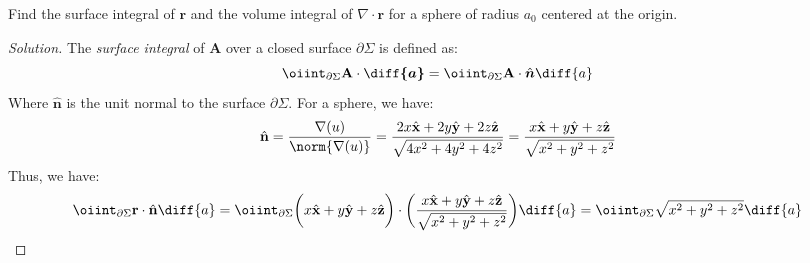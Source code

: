 \documentclass[crop=false,class=book,oneside]{standalone}
\begin{document}
            \begin{problem}[Wangsness 1-12]
                \label{problem:EMAG_1_wangsness_1_12}
                Find the surface integral of $\mathbf{r}$ and the
                volume integral of $\nabla\cdot\mathbf{r}$
                for a sphere of radius $a_{0}$
                centered at the origin.
            \end{problem}
            \begin{proof}[Solution]
                The \textit{surface integral} of $\mathbf{A}$
                over a closed surface
                $\partial\Sigma$ is defined as:
                \begin{equation*}
                    \oiint_{\partial\Sigma}
                    \mathbf{A}\cdot\boldsymbol{\diff{a}}
                    =\oiint_{\partial\Sigma}\mathbf{A}
                    \cdot\hat{\boldsymbol{n}}\diff{a}
                \end{equation*}
                Where $\hat{\mathbf{n}}$ is the unit normal
                to the surface $\partial\Sigma$.
                For a sphere, we have:
                \begin{equation*}
                    \hat{\mathbf{n}}
                    =\frac{\nabla(u)}{\norm{\nabla(u)}}
                    =\frac{2x\hat{\mathbf{x}}
                    +2y\hat{\mathbf{y}}
                    +2z\hat{\mathbf{z}}}
                    {\sqrt{4x^{2}+4y^{2}+4z^{2}}}
                    =\frac{x\hat{\mathbf{x}}
                    +y\hat{\mathbf{y}}
                    +z\hat{\mathbf{z}}}
                    {\sqrt{x^{2}+y^{2}+z^{2}}}
                \end{equation*}
                Thus, we have:
                \begin{equation*}
                    \oiint_{\partial\Sigma}
                    \mathbf{r}\cdot\hat{\mathbf{n}}\diff{a}
                    =\oiint_{\partial\Sigma}
                    \bigg(
                         x\hat{\mathbf{x}}
                        +y\hat{\mathbf{y}}
                        +z\hat{\mathbf{z}}
                    \bigg)\cdot\bigg(
                        \frac{%
                             x\hat{\mathbf{x}}
                            +y\hat{\mathbf{y}}
                            +z\hat{\mathbf{z}}}
                            {\sqrt{x^{2}+y^{2}+z^{2}}}
                        \bigg)\diff{a}
                    =\oiint_{\partial\Sigma}
                    \sqrt{x^{2}+y^{2}+z^{2}}\diff{a}
                \end{equation*}

\end{proof}
\end{document}
